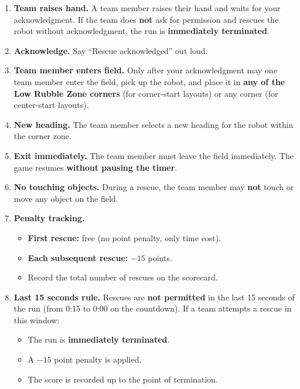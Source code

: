 \documentclass[a4]{article}
\begin{document}
\begin{enumerate}
    \item \textbf{Team raises hand.} A team member raises their hand and waits for your acknowledgment. If the team does \textbf{not} ask for permission and rescues the robot without acknowledgment, the run is \textbf{immediately terminated}.

    \item \textbf{Acknowledge.} Say ``Rescue acknowledged'' out loud.

    \item \textbf{Team member enters field.} Only after your acknowledgment may one team member enter the field, pick up the robot, and place it in \textbf{any of the Low Rubble Zone corners} (for corner-start layouts) or any corner (for center-start layouts).

    \item \textbf{New heading.} The team member selects a new heading for the robot within the corner zone.

    \item \textbf{Exit immediately.} The team member must leave the field immediately. The game resumes \textbf{without pausing the timer}.

    \item \textbf{No touching objects.} During a rescue, the team member may \textbf{not} touch or move any object on the field.

    \item \textbf{Penalty tracking.}
    \begin{itemize}
        \item \textbf{First rescue:} free (no point penalty, only time cost).
        \item \textbf{Each subsequent rescue:} $-15$ points.
        \item Record the total number of rescues on the scorecard.
    \end{itemize}

    \item \textbf{Last 15 seconds rule.} Rescues are \textbf{not permitted} in the last 15 seconds of the run (from 0:15 to 0:00 on the countdown). If a team attempts a rescue in this window:
    \begin{itemize}
        \item The run is \textbf{immediately terminated}.
        \item A $-15$ point penalty is applied.
        \item The score is recorded up to the point of termination.
    \end{itemize}
\end{enumerate}
\end{document}
